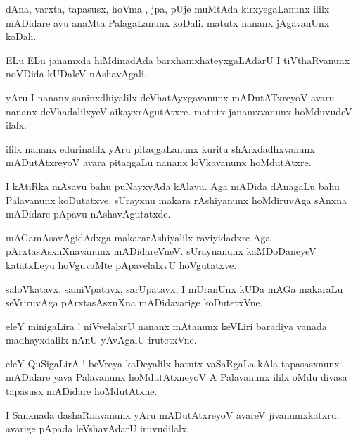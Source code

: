 \documentclass{article}
\begin{document}
\begin{mn}%
dAna, varxta, tapasusx, hoVma , jpa, pUje muMtAda kirxyegaLanunx ililx mADidare avu anaMta 
PalagaLanunx koDali. matutx nananx jAgavanUnx koDali.
\end{mn}

\begin{mn}%
ELu ELu janamxda hiMdinadAda barxhamxhateyxgaLAdarU I tiVthaRvanunx noVDida kUDaleV nAshavAgali.
\end{mn}

\begin{mn}%
yAru I nananx saninxdhiyalilx deVhatAyxgavanunx mADutATxreyoV avaru nananx deVhadalilxyeV 
aikayxrAgutAtxre. matutx janamxvanunx hoMduvudeV ilalx.
\end{mn}

\begin{mn}%
ililx nananx edurinalilx yAru pitaqgaLanunx kuritu shArxdadhxvanunx mADutAtxreyoV avara pitaqgaLu 
nananx loVkavanunx hoMdutAtxre.
\end{mn}

\begin{mn}%
I kAtiRka mAsavu bahu puNayxvAda kAlavu. Aga mADida dAnagaLu bahu Palavanunx koDutatxve. sUrayxnu 
makara rAshiyanunx hoMdiruvAga sAnxna mADidare pApavu nAshavAgutatxde.
\end{mn}

\begin{mn}%
mAGamAsavAgidAdxga makararAshiyalilx raviyidadxre Aga pArxtasAsxnXnavanunx mADidareVneV. 
sUraynanunx kaMDoDaneyeV katatxLeyu hoVguvaMte pApavelalxvU hoVgutatxve.
\end{mn}

\begin{mn}%
saloVkatavx, samiVpatavx, sarUpatavx, I mUranUnx kUDa mAGa makaraLu seVriruvAga pArxtasAsxnXna 
mADidavarige koDutetxVne.
\end{mn}

\begin{mn}%
eleY minigaLira ! niVvelalxrU nananx mAtanunx keVLiri baradiya vanada madhayxdalilx nAnU yAvAgalU 
irutetxVne.
\end{mn}

\begin{mn}%
eleY QuSigaLirA ! beVreya kaDeyalilx hatutx vaSaRgaLa kAla tapasasxnunx mADidare yava Palavanunx 
hoMdutAtxneyoV A Palavanunx ililx oMdu divasa tapasusx mADidare hoMdutAtxne.
\end{mn}

\begin{mn}%
I Sanxnada dashaRnavanunx yAru mADutAtxreyoV avareV jivanumxkatxru. avarige pApada leVshavAdarU 
iruvudilalx.
\end{mn}
\end{document}
